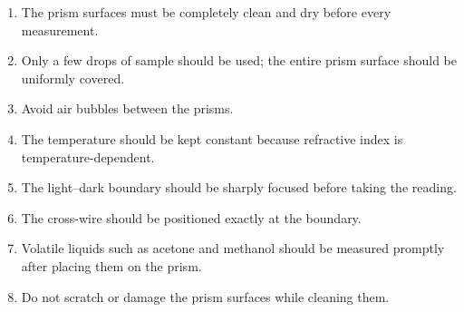 \documentclass[12pt,a4paper]{article}
\begin{document}
\begin{enumerate}
    \item The prism surfaces must be completely clean and dry before every measurement.
    \item Only a few drops of sample should be used; the entire prism surface should be uniformly covered.
    \item Avoid air bubbles between the prisms.
    \item The temperature should be kept constant because refractive index is temperature-dependent.
    \item The light--dark boundary should be sharply focused before taking the reading.
    \item The cross-wire should be positioned exactly at the boundary.
    \item Volatile liquids such as acetone and methanol should be measured promptly after placing them on the prism.
    \item Do not scratch or damage the prism surfaces while cleaning them.
\end{enumerate}
\end{document}
